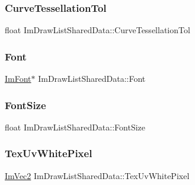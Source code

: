 \subsubsection{\texorpdfstring{Curve\+Tessellation\+Tol}{CurveTessellationTol}}
{\footnotesize\ttfamily float Im\+Draw\+List\+Shared\+Data\+::\+Curve\+Tessellation\+Tol}

\hypertarget{struct_im_draw_list_shared_data_a4542431d4afe5320a965fbe52a3cc39f}{}\label{struct_im_draw_list_shared_data_a4542431d4afe5320a965fbe52a3cc39f} 
\subsubsection{\texorpdfstring{Font}{Font}}
{\footnotesize\ttfamily \hyperlink{struct_im_font}{Im\+Font}$\ast$ Im\+Draw\+List\+Shared\+Data\+::\+Font}

\hypertarget{struct_im_draw_list_shared_data_a189a412fcd4f66a1d60501ad758d04bd}{}\label{struct_im_draw_list_shared_data_a189a412fcd4f66a1d60501ad758d04bd} 
\subsubsection{\texorpdfstring{Font\+Size}{FontSize}}
{\footnotesize\ttfamily float Im\+Draw\+List\+Shared\+Data\+::\+Font\+Size}

\hypertarget{struct_im_draw_list_shared_data_a8dff5fc643cab17128012383d75d9ad8}{}\label{struct_im_draw_list_shared_data_a8dff5fc643cab17128012383d75d9ad8} 
\subsubsection{\texorpdfstring{Tex\+Uv\+White\+Pixel}{TexUvWhitePixel}}
{\footnotesize\ttfamily \hyperlink{struct_im_vec2}{Im\+Vec2} Im\+Draw\+List\+Shared\+Data\+::\+Tex\+Uv\+White\+Pixel}

